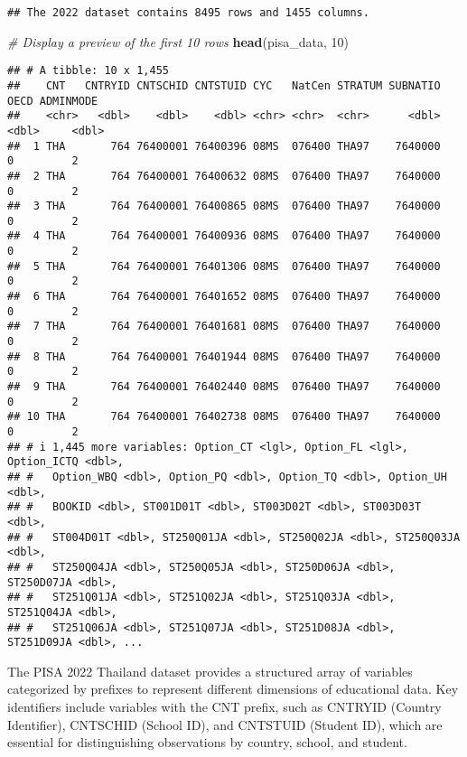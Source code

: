 \documentclass[
]{article}
\newenvironment{Shaded}{\begin{snugshade}}{\end{snugshade}}
\newcommand{\CommentTok}[1]{\textcolor[rgb]{0.56,0.35,0.01}{\textit{#1}}}
\newcommand{\DecValTok}[1]{\textcolor[rgb]{0.00,0.00,0.81}{#1}}
\newcommand{\FunctionTok}[1]{\textcolor[rgb]{0.13,0.29,0.53}{\textbf{#1}}}
\newcommand{\NormalTok}[1]{#1}
\begin{document}
\begin{verbatim}
## The 2022 dataset contains 8495 rows and 1455 columns.
\end{verbatim}

\begin{Shaded}
\begin{Highlighting}[]
\CommentTok{\# Display a preview of the first 10 rows}
\FunctionTok{head}\NormalTok{(pisa\_data, }\DecValTok{10}\NormalTok{)}
\end{Highlighting}
\end{Shaded}

\begin{verbatim}
## # A tibble: 10 x 1,455
##    CNT   CNTRYID CNTSCHID CNTSTUID CYC   NatCen STRATUM SUBNATIO  OECD ADMINMODE
##    <chr>   <dbl>    <dbl>    <dbl> <chr> <chr>  <chr>      <dbl> <dbl>     <dbl>
##  1 THA       764 76400001 76400396 08MS  076400 THA97    7640000     0         2
##  2 THA       764 76400001 76400632 08MS  076400 THA97    7640000     0         2
##  3 THA       764 76400001 76400865 08MS  076400 THA97    7640000     0         2
##  4 THA       764 76400001 76400936 08MS  076400 THA97    7640000     0         2
##  5 THA       764 76400001 76401306 08MS  076400 THA97    7640000     0         2
##  6 THA       764 76400001 76401652 08MS  076400 THA97    7640000     0         2
##  7 THA       764 76400001 76401681 08MS  076400 THA97    7640000     0         2
##  8 THA       764 76400001 76401944 08MS  076400 THA97    7640000     0         2
##  9 THA       764 76400001 76402440 08MS  076400 THA97    7640000     0         2
## 10 THA       764 76400001 76402738 08MS  076400 THA97    7640000     0         2
## # i 1,445 more variables: Option_CT <lgl>, Option_FL <lgl>, Option_ICTQ <dbl>,
## #   Option_WBQ <dbl>, Option_PQ <dbl>, Option_TQ <dbl>, Option_UH <dbl>,
## #   BOOKID <dbl>, ST001D01T <dbl>, ST003D02T <dbl>, ST003D03T <dbl>,
## #   ST004D01T <dbl>, ST250Q01JA <dbl>, ST250Q02JA <dbl>, ST250Q03JA <dbl>,
## #   ST250Q04JA <dbl>, ST250Q05JA <dbl>, ST250D06JA <dbl>, ST250D07JA <dbl>,
## #   ST251Q01JA <dbl>, ST251Q02JA <dbl>, ST251Q03JA <dbl>, ST251Q04JA <dbl>,
## #   ST251Q06JA <dbl>, ST251Q07JA <dbl>, ST251D08JA <dbl>, ST251D09JA <dbl>, ...
\end{verbatim}

The PISA 2022 Thailand dataset provides a structured array of variables
categorized by prefixes to represent different dimensions of educational
data. Key identifiers include variables with the CNT prefix, such as
CNTRYID (Country Identifier), CNTSCHID (School ID), and CNTSTUID
(Student ID), which are essential for distinguishing observations by
country, school, and student.
\end{document}
